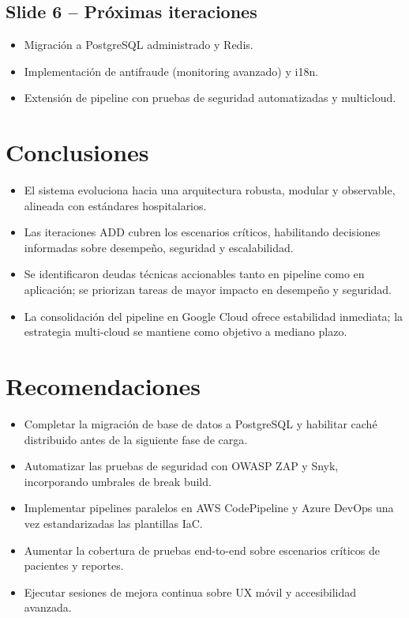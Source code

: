 \documentclass[12pt,letterpaper]{article}
\begin{document}
\subsection*{Slide 6 -- Próximas iteraciones}
\begin{itemize}[leftmargin=1.2cm]
  \item Migración a PostgreSQL administrado y Redis.
  \item Implementación de antifraude (monitoring avanzado) y i18n.
  \item Extensión de pipeline con pruebas de seguridad automatizadas y multicloud.
\end{itemize}

\section{Conclusiones}
\begin{itemize}[leftmargin=1.2cm]
  \item El sistema evoluciona hacia una arquitectura robusta, modular y observable, alineada con estándares hospitalarios.
  \item Las iteraciones ADD cubren los escenarios críticos, habilitando decisiones informadas sobre desempeño, seguridad y escalabilidad.
  \item Se identificaron deudas técnicas accionables tanto en pipeline como en aplicación; se priorizan tareas de mayor impacto en desempeño y seguridad.
  \item La consolidación del pipeline en Google Cloud ofrece estabilidad inmediata; la estrategia multi-cloud se mantiene como objetivo a mediano plazo.
\end{itemize}

\section{Recomendaciones}
\begin{itemize}[leftmargin=1.2cm]
  \item Completar la migración de base de datos a PostgreSQL y habilitar caché distribuido antes de la siguiente fase de carga.
  \item Automatizar las pruebas de seguridad con OWASP ZAP y Snyk, incorporando umbrales de break build.
  \item Implementar pipelines paralelos en AWS CodePipeline y Azure DevOps una vez estandarizadas las plantillas IaC.
  \item Aumentar la cobertura de pruebas end-to-end sobre escenarios críticos de pacientes y reportes.
  \item Ejecutar sesiones de mejora continua sobre UX móvil y accesibilidad avanzada.
\end{itemize}
\end{document}
